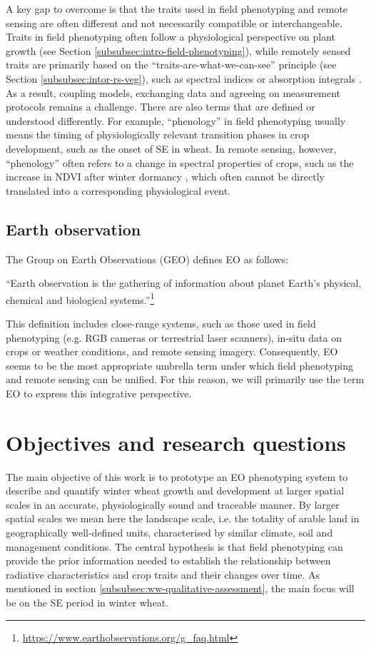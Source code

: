 A key gap to overcome is that the traits used in field phenotyping and remote sensing are often different and not necessarily compatible or interchangeable. Traits in field phenotyping often follow a physiological perspective on plant growth (see Section \ref{subsubsec:intro-field-phenotyping}), while remotely sensed traits are primarily based on the ``traits-are-what-we-can-see'' principle (see Section \ref{subsubsec:intor-rs-veg}), such as spectral indices \cite{bannari_review_1995} or absorption integrals \citep[for example]{wocher_rtm-based_2020}. As a result, coupling models, exchanging data and agreeing on measurement protocols remains a challenge. There are also terms that are defined or understood differently. For example, ``phenology'' in field phenotyping usually means the timing of physiologically relevant transition phases in crop development, such as the onset of \gls{SE} in wheat. In remote sensing, however, ``phenology'' often refers to a change in spectral properties of crops, such as the increase in \gls{NDVI} after winter dormancy \citep{de_beurs_land_2004}, which often cannot be directly translated into a corresponding physiological event.

\subsection{Earth observation}
\label{subsubsec:intro-eo}
The Group on Earth Observations (GEO) defines \gls{EO} as follows:
\begin{displayquote}
``Earth observation is the gathering of information about planet Earth's physical, chemical and biological systems.''\footnote{\url{https://www.earthobservations.org/g_faq.html}}
\end{displayquote}
This definition includes close-range systems, such as those used in field phenotyping (e.g. RGB cameras or terrestrial laser scanners), in-situ data on crops or weather conditions, and remote sensing imagery.
Consequently, \gls{EO} seems to be the most appropriate umbrella term under which field phenotyping and remote sensing can be unified. For this reason, we will primarily use the term \gls{EO} to express this integrative perspective.

\section{Objectives and research questions}
\label{sec:intro-obj-rj}
The main objective of this work is to prototype an \gls{EO} phenotyping system to describe and quantify winter wheat growth and development at larger spatial scales in an accurate, physiologically sound and traceable manner. By larger spatial scales we mean here the landscape scale, i.e. the totality of arable land in geographically well-defined units, characterised by similar climate, soil and management conditions. The central hypothesis is that field phenotyping can provide the prior information needed to establish the relationship between radiative characteristics and crop traits and their changes over time. As mentioned in section \ref{subsubsec:ww-qualitative-assessment}, the main focus will be on the \gls{SE} period in winter wheat.

